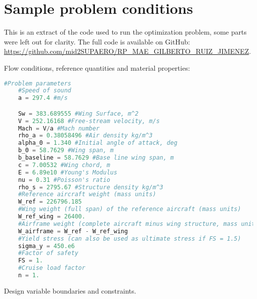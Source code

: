 \section{Sample problem conditions}
\label{sec:sampleprob}
This is an extract of the code used to run the optimization problem, some parts were left out for clarity. The full code is available on GitHub: \url{https://github.com/mid2SUPAERO/RP_MAE_GILBERTO_RUIZ_JIMENEZ}. 

Flow conditions, reference quantities and material properties:
\begin{lstlisting}[language=Python]
    #Problem parameters
    #Speed of sound
    a = 297.4 #m/s

    Sw = 383.689555 #Wing Surface, m^2
    V = 252.16168 #Free-stream velocity, m/s
    Mach = V/a #Mach number
    rho_a = 0.38058496 #Air density kg/m^3
    alpha_0 = 1.340 #Initial angle of attack, deg
    b_0 = 58.7629 #Wing span, m
    b_baseline = 58.7629 #Base line wing span, m
    c = 7.00532 #Wing chord, m
    E = 6.89e10 #Young's Modulus
    nu = 0.31 #Poisson's ratio
    rho_s = 2795.67 #Structure density kg/m^3
    #Reference aircraft weight (mass units)
    W_ref = 226796.185
    #Wing weight (full span) of the reference aircraft (mass units)
    W_ref_wing = 26400.
    #Airframe weight (complete aircraft minus wing structure, mass units)
    W_airframe = W_ref - W_ref_wing
    #Yield stress (can also be used as ultimate stress if FS = 1.5)
    sigma_y = 450.e6
    #Factor of safety
    FS = 1.
    #Cruise load factor
    n = 1.
\end{lstlisting}
Design variable boundaries and constraints.
